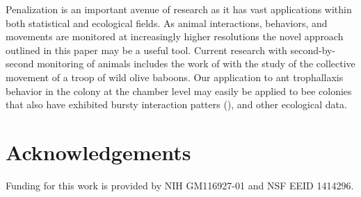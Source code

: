 \documentclass[smallextended]{svjour3}       %
\begin{document}
Penalization is an important avenue of research as it has vast applications within both statistical and ecological fields. As animal interactions, behaviors, and movements are monitored at increasingly higher resolutions the novel approach outlined in this paper may be a useful tool. Current research with second-by-second monitoring of animals includes the work of \cite{Farine2016} with the study of the collective movement of a troop of wild olive baboons. Our application to ant trophallaxis behavior in the colony at the chamber level may easily be applied to bee colonies that also have exhibited bursty interaction patters (\cite{Gernat2017}), and other ecological data. 



\section*{Acknowledgements}
Funding for this work is provided by NIH GM116927-01 and NSF EEID 1414296. 








    
\end{document}

